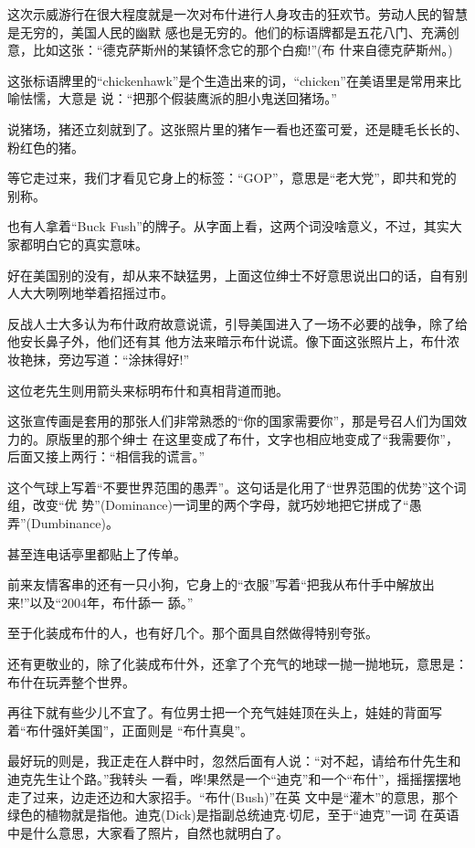 ﻿\documentclass[11pt]{article}
\begin{document}
这次示威游行在很大程度就是一次对布什进行人身攻击的狂欢节。劳动人民的智慧是无穷的，美国人民的幽默
感也是无穷的。他们的标语牌都是五花八门、充满创意，比如这张：``德克萨斯州的某镇怀念它的那个白痴!''(布
什来自德克萨斯州。)

这张标语牌里的``chickenhawk''是个生造出来的词，``chicken''在美语里是常用来比喻怯懦，大意是
说：``把那个假装鹰派的胆小鬼送回猪场。''

说猪场，猪还立刻就到了。这张照片里的猪乍一看也还蛮可爱，还是睫毛长长的、粉红色的猪。

等它走过来，我们才看见它身上的标签：``GOP''，意思是``老大党''，即共和党的别称。

也有人拿着``Buck Fush''的牌子。从字面上看，这两个词没啥意义，不过，其实大家都明白它的真实意味。

好在美国别的没有，却从来不缺猛男，上面这位绅士不好意思说出口的话，自有别人大大咧咧地举着招摇过市。

反战人士大多认为布什政府故意说谎，引导美国进入了一场不必要的战争，除了给他安长鼻子外，他们还有其
他方法来暗示布什说谎。像下面这张照片上，布什浓妆艳抹，旁边写道：``涂抹得好!''

这位老先生则用箭头来标明布什和真相背道而驰。

这张宣传画是套用的那张人们非常熟悉的``你的国家需要你''，那是号召人们为国效力的。原版里的那个绅士
在这里变成了布什，文字也相应地变成了``我需要你''，后面又接上两行：``相信我的谎言。''

这个气球上写着``不要世界范围的愚弄''。这句话是化用了``世界范围的优势''这个词组，改变``优
势''(Dominance)一词里的两个字母，就巧妙地把它拼成了``愚弄''(Dumbinance)。

甚至连电话亭里都贴上了传单。

前来友情客串的还有一只小狗，它身上的``衣服''写着``把我从布什手中解放出来!''以及``2004年，布什舔一
舔。''

至于化装成布什的人，也有好几个。那个面具自然做得特别夸张。

还有更敬业的，除了化装成布什外，还拿了个充气的地球一抛一抛地玩，意思是：布什在玩弄整个世界。

再往下就有些少儿不宜了。有位男士把一个充气娃娃顶在头上，娃娃的背面写着``布什强奸美国''，正面则是
``布什真臭''。

最好玩的则是，我正走在人群中时，忽然后面有人说：``对不起，请给布什先生和迪克先生让个路。''我转头
一看，哗!果然是一个``迪克''和一个``布什''，摇摇摆摆地走了过来，边走还边和大家招手。``布什(Bush)''在英
文中是``灌木''的意思，那个绿色的植物就是指他。迪克(Dick)是指副总统迪克$\cdot$切尼，至于``迪克''一词
在英语中是什么意思，大家看了照片，自然也就明白了。
\end{document}
